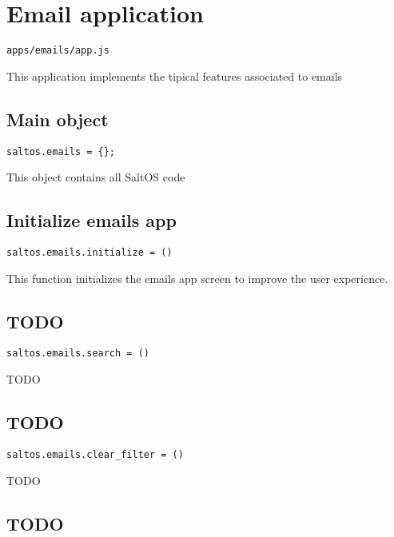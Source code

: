 \documentclass[a4paper]{book}
\begin{document}
\hypertarget{toc521}{}
\section{Email application}

\begin{lstlisting}
apps/emails/app.js
\end{lstlisting}

This application implements the tipical features associated to emails

\hypertarget{toc522}{}
\subsection{Main object}

\begin{lstlisting}
saltos.emails = {};
\end{lstlisting}

This object contains all SaltOS code

\hypertarget{toc523}{}
\subsection{Initialize emails app}

\begin{lstlisting}
saltos.emails.initialize = ()
\end{lstlisting}

This function initializes the emails app screen to improve the user experience.

\hypertarget{toc524}{}
\subsection{TODO}

\begin{lstlisting}
saltos.emails.search = ()
\end{lstlisting}

TODO

\hypertarget{toc525}{}
\subsection{TODO}

\begin{lstlisting}
saltos.emails.clear_filter = ()
\end{lstlisting}

TODO

\hypertarget{toc526}{}
\subsection{TODO}
\end{document}
